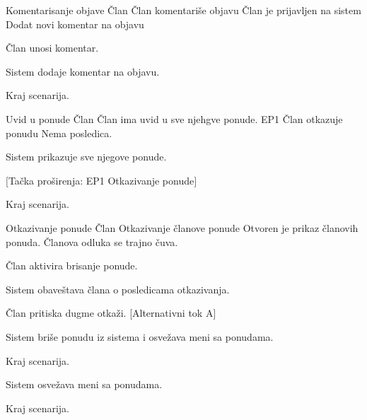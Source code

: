          {Komentarisanje objave}
         {Član}
         {Član komentariše objavu}
         {Član je prijavljen na sistem}
         {Dodat novi komentar na objavu}
         {
            \item Član unosi komentar.
            \item Sistem dodaje komentar na objavu.
            \item Kraj scenarija.
         }
         {}

         {Uvid u ponude}
         {Član}
         {Član ima uvid u sve njehgve ponude. EP1 Član otkazuje ponudu}
         {}
         {Nema posledica.}
         {
            \item Sistem prikazuje sve njegove ponude.
            \item $[$Tačka proširenja: EP1 Otkazivanje ponude$]$
            \item Kraj scenarija.
         }
         {}

        {Otkazivanje ponude}
        {Član}
        {Otkazivanje članove ponude}
        {Otvoren je prikaz članovih ponuda.}
        {Članova odluka se trajno čuva.}
        {
            \item Član aktivira brisanje ponude.
            \item Sistem obaveštava člana o posledicama otkazivanja.
            \item Član pritiska dugme otkaži. [Alternativni tok A]
            \item Sistem briše ponudu iz sistema i osvežava meni sa ponudama.
            \item Kraj scenarija.
        }
        {
            {
                \item Sistem osvežava meni sa ponudama.
                \item Kraj scenarija.
            }
        }